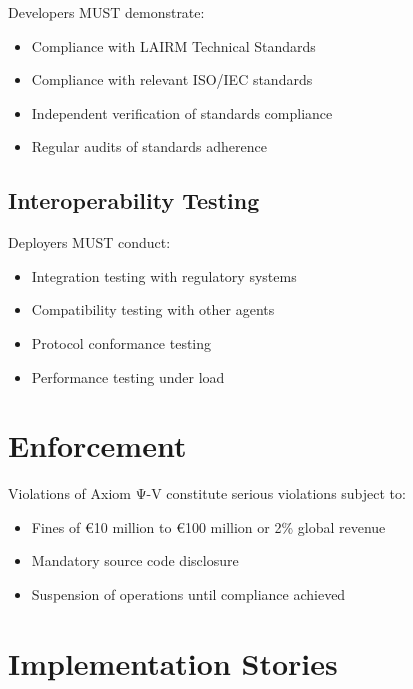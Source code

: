 Developers MUST demonstrate:

\begin{itemize}
    \item Compliance with LAIRM Technical Standards
    \item Compliance with relevant ISO/IEC standards
    \item Independent verification of standards compliance
    \item Regular audits of standards adherence
\end{itemize}

\subsection{Interoperability Testing}

Deployers MUST conduct:

\begin{itemize}
    \item Integration testing with regulatory systems
    \item Compatibility testing with other agents
    \item Protocol conformance testing
    \item Performance testing under load
\end{itemize}

\vspace{0.5cm}

\section{Enforcement}

Violations of Axiom Ψ-V constitute serious violations subject to:

\begin{itemize}
    \item Fines of €10 million to €100 million or 2\% global revenue
    \item Mandatory source code disclosure
    \item Suspension of operations until compliance achieved
\end{itemize}

\vspace{0.5cm}

\section{Implementation Stories}

